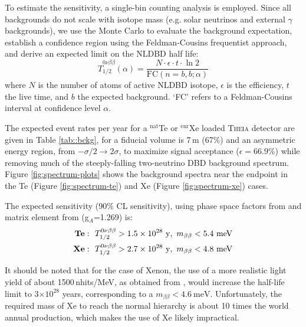 To estimate the sensitivity, a single-bin counting analysis is employed. Since all backgrounds do not scale with isotope mass (e.g. solar neutrinos
and external $\gamma$ backgrounds), we use the Monte Carlo to evaluate the background expectation, establish a confidence region using the Feldman-Cousins frequentist approach, and derive an expected limit on the NLDBD half life:
\begin{equation}
\label{eq:sens}
\widehat{T}_{1/2}^{0\nu\beta\beta}(\alpha) = 
\frac{N\cdot \epsilon \cdot t \cdot \ln 2}{\mathrm{FC}(n=b, b; \alpha)}
\end{equation}
where $N$ is the number of atoms of active NLDBD isotope, $\epsilon$ is the efficiency, $t$ the live time, and $b$ the expected background.
`FC' refers to a Feldman-Cousins interval at confidence level $\alpha$.

The expected event rates per year for a $^\mathrm{nat}$Te or $^\mathrm{enr}$Xe loaded \textsc{Theia} detector are given in Table \ref{tab::bckg}, for a fiducial volume is 7\,m (67\%) and an asymmetric energy region,  from $-\sigma/2 \to 2\sigma$, to maximize signal acceptance ($\epsilon=66.9$\%) while removing much of the steeply-falling two-neutrino DBD background spectrum. Figure \ref{fig:spectrum-plots} shows the background spectra near the endpoint in the Te (Figure \ref{fig:spectrum-te}) and Xe (Figure \ref{fig:spectrum-xe}) cases.

The expected sensitivity (90\% CL sensitivity), using phase space factors from \cite{2012PhRvC..85c4316K} and matrix element from \cite{Barea:2013wb} (g$_{A}$=1.269) is:
\begin{eqnarray*}
\mathrm{\bf Te:}~~
  T_{1/2}^{0\nu\beta\beta} > 1.5\times10^{28}~\mathrm{y},~
  m_{\beta\beta} < 5.4~\mathrm{meV}\\
  \mathrm{\bf Xe:}~~
  T_{1/2}^{0\nu\beta\beta} > 2.7\times10^{28}~\mathrm{y},~
  m_{\beta\beta} < 4.8~\mathrm{meV}
\end{eqnarray*}

It should be noted that for the case of Xenon, the use of a more realistic light yield of about 1500\,nhits/MeV, as obtained from  \cite{KZ-2011}, would increase the half-life limit to 3$\times 10^{28}$ years, corresponding to a $m_{\beta\beta} < 4.6~\mathrm{meV}$. Unfortunately, the required mass of Xe to reach the normal hierarchy is about 10 times the world annual production, which makes the use of Xe likely impractical.

